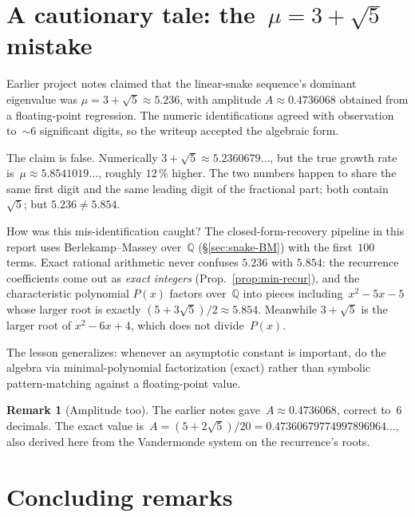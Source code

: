 \documentclass[11pt,a4paper]{article}
\newcommand{\SI}[2]{#1\,#2}
\newcommand{\percent}[0]{\%}
\theoremstyle{definition}
\newtheorem{remark}[definition]{Remark}
\theoremstyle{plain}
\newcommand{\Q}{\mathbb{Q}}
\begin{document}
\section{A cautionary tale: the~$\mu = 3 + \sqrt{5}$ mistake}\label{sec:mistake}

Earlier project notes claimed that the linear-snake sequence's dominant
eigenvalue was $\mu = 3 + \sqrt{5} \approx 5.236$, with amplitude
$A \approx 0.4736068$ obtained from a floating-point regression.  The
numeric identifications agreed with observation to~$\sim 6$ significant
digits, so the writeup accepted the algebraic form.

The claim is false.  Numerically $3 + \sqrt{5} \approx 5.2360679\ldots$,
but the true growth rate is~$\mu \approx 5.8541019\ldots$, roughly
$\SI{12}{\percent}$ higher.  The two numbers happen to share the same
first digit and the same leading digit of the fractional part; both
contain~$\sqrt{5}$; but $5.236 \neq 5.854$.

How was this mis-identification caught?  The closed-form-recovery
pipeline in this report uses Berlekamp--Massey over~$\Q$ (\S\ref{sec:snake-BM})
with the first~$100$ terms.  Exact rational arithmetic never confuses
$5.236$ with $5.854$: the recurrence coefficients come out as \emph{exact
integers} (Prop.~\ref{prop:min-recur}), and the characteristic polynomial
$P(x)$ factors over~$\Q$ into pieces including~$x^2 - 5x - 5$ whose larger
root is exactly $(5 + 3\sqrt{5})/2 \approx 5.854$.  Meanwhile $3 + \sqrt{5}$
is the larger root of $x^2 - 6x + 4$, which does not divide~$P(x)$.

The lesson generalizes: whenever an asymptotic constant is important, do
the algebra via minimal-polynomial factorization (exact) rather than
symbolic pattern-matching against a floating-point value.

\begin{remark}[Amplitude too]
The earlier notes gave~$A \approx 0.4736068$, correct to~$6$ decimals.
The exact value is~$A = (5 + 2\sqrt{5})/20 = 0.47360679774997896964\ldots$,
also derived here from the Vandermonde system on the recurrence's roots.
\end{remark}

\section{Concluding remarks}\label{sec:conclusion}
\end{document}
